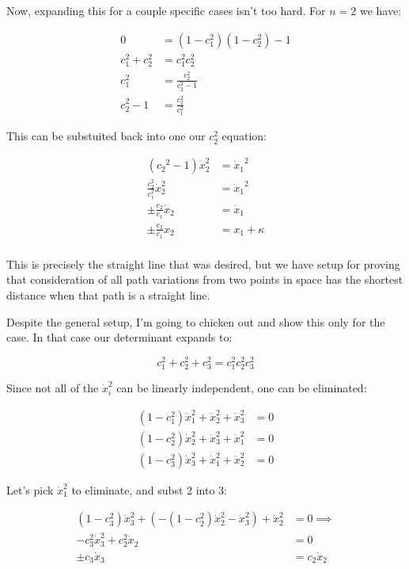 \documentclass{article}
\newcommand{\xdot}[0]{\dot{x}}
\begin{document}
Now, expanding this for a couple specific cases isn't too hard.  For $n=2$ we have:

\begin{align*}
0 &= (1 - c_1^2)(1-c_2^2) - 1 \\
c_1^2 + c_2^2 &= c_1^2 c_2^2 \\
c_1^2 &= \frac{c_2^2}{ c_2^2 - 1 } \\
c_2^2 - 1 &= \frac{c_2^2}{ c_1^2 }
\end{align*}

This can be substuited back into one our $c_2^2$ equation:

\begin{align*}
({c_2}^2 -1)\xdot_2^2 &= {\xdot_1}^2 \\
\frac{c_2^2}{ c_1^2 } \xdot_2^2 &= {\xdot_1}^2 \\
\pm \frac{c_2}{ c_1 } \xdot_2 &= {\xdot_1} \\
\pm \frac{c_2}{ c_1 } x_2 &= x_1 + \kappa \\
\end{align*}

This is precisely the straight line that was desired, but we have setup for proving that consideration of all path variations from two points 
in  space has the shortest distance when that path is a straight line.

Despite the general setup, I'm going to chicken out and show this only for the  case.  In that case our determinant expands to:

\begin{equation*}
c_1^2 + c_2^2 + c_3^2 = c_1^2 c_2^2 c_3^2
\end{equation*}

Since not all of the $\xdot_i^2$ can be linearly independent, one can be eliminated:

\begin{align*}
(1 - c_1^2) \xdot_1^2 + \xdot_2^2 + \xdot_3^2 &= 0 \\
(1 - c_2^2) \xdot_2^2 + \xdot_3^2 + \xdot_1^2 &= 0 \\
(1 - c_3^2) \xdot_3^2 + \xdot_1^2 + \xdot_2^2 &= 0
\end{align*}

Let's pick $\xdot_1^2$ to eliminate, and subst 2 into 3:

\begin{align*}
(1 - c_3^2) \xdot_3^2 + (-(1 - c_2^2) \xdot_2^2 - \xdot_3^2) + \xdot_2^2 &= 0
\implies \\
- c_3^2 \xdot_3^2 + c_2^2 \xdot_2 &= 0 \\
\pm c_3 \xdot_3 &= c_2 \xdot_2 \\
\end{align*}
\end{document}
